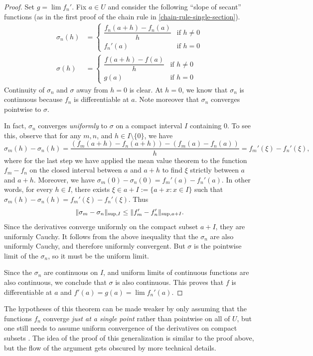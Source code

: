 \begin{proof}
	Set $g = \lim f_n'$. Fix $a \in U$ and consider the following ``slope of secant'' functions (as in the first proof of the chain rule in \cref{chain-rule-single-section}). 
	\[ \begin{aligned} \sigma_n(h) &= \begin{cases} \dfrac{f_n(a+h) - f_n(a)}{h} & \text{if } h  \neq 0 \\ f_n'(a) & \text{if } h = 0 \end{cases} \\ 
	\sigma(h) &= \begin{cases} \dfrac{f(a+h) - f(a)}{h} & \text{if } h  \neq 0 \\ g(a) & \text{if } h = 0 \end{cases} \end{aligned} \]
	Continuity of $\sigma_n$ and $\sigma$ away from $h = 0$ is clear. At $h = 0$, we know that $\sigma_n$ is continuous because $f_n$ is differentiable at $a$. Note moreover that $\sigma_n$ converges pointwise to $\sigma$. 
	
	In fact, $\sigma_n$ converges \emph{uniformly} to $\sigma$ on a compact interval $I$ containing 0. To see this, observe that for any $m, n$, and $h \in I \setminus \{0\}$, we have
	\[ \sigma_m(h) - \sigma_n(h) = \frac{(f_m(a+h) - f_n(a+h)) - (f_m(a) - f_n(a))}{h} = f_m'(\xi) - f_n'(\xi), \]
	where for the last step we have applied the mean value theorem to the function $f_m - f_n$ on the closed interval between $a$ and $a + h$ to find $\xi$ strictly between $a$ and $a + h$. Moreover, we have $\sigma_m(0) - \sigma_n(0) = f_m'(a) - f_n'(a)$. In other words, for every $h \in I$, there exists $\xi \in a + I := \{a + x : x \in I\}$ such that $\sigma_m(h) - \sigma_n(h) = f_m'(\xi) - f_n'(\xi)$. Thus
	\[ \|\sigma_m - \sigma_n\|_{\mathrm{sup}, I} \leq \|f_m' - f_n'\|_{\mathrm{sup}, a+I}. \]
	Since the derivatives converge uniformly on the compact subset $a+I$, they are uniformly Cauchy. It follows from the above inequality that the $\sigma_n$ are also uniformly Cauchy, and therefore uniformly convergent. But $\sigma$ is the pointwise limit of the $\sigma_n$, so it must be the uniform limit. 
	
	Since the $\sigma_n$ are continuous on $I$, and uniform limits of continuous functions are also continuous, we conclude that $\sigma$ is also continuous. This proves that $f$ is differentiable at $a$ and $f'(a) = g(a) = \lim f_n'(a)$. 
\end{proof}

\begin{remark}
	The hypotheses of this theorem can be made weaker by only assuming that the functions $f_n$ converge \emph{just at a single point} rather than pointwise on all of $U$, but one still needs to assume uniform convergence of the derivatives on compact subsets \cite[theorem 7.17]{rudin}. The idea of the proof of this generalization is similar to the proof above, but the flow of the argument gets obscured by more technical details. 
\end{remark}

